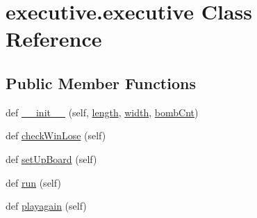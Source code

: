 \hypertarget{classexecutive_1_1executive}{}\section{executive.\+executive Class Reference}
\label{classexecutive_1_1executive}
\subsection*{Public Member Functions}
\begin{DoxyCompactItemize}
\item 
def \mbox{\hyperlink{classexecutive_1_1executive_a7456b110c146af5391ea26770144b461}{\+\_\+\+\_\+init\+\_\+\+\_\+}} (self, \mbox{\hyperlink{classexecutive_1_1executive_afcb8b34bb0f032c2ffae4573b9a42613}{length}}, \mbox{\hyperlink{classexecutive_1_1executive_a3ffae68509fd1c2b2043198df88b913c}{width}}, \mbox{\hyperlink{classexecutive_1_1executive_ab749a7a52e7361de73ee03285a25e804}{bomb\+Cnt}})
\item 
def \mbox{\hyperlink{classexecutive_1_1executive_a944d536ab4e80df2ef4c0494d7ea9f19}{check\+Win\+Lose}} (self)
\item 
def \mbox{\hyperlink{classexecutive_1_1executive_ae2161d95542ae653323bbfb9ae0ac27b}{set\+Up\+Board}} (self)
\item 
def \mbox{\hyperlink{classexecutive_1_1executive_abe92cddf119081cac6c747858df061d7}{run}} (self)
\item 
def \mbox{\hyperlink{classexecutive_1_1executive_ae9e95e04cf6a35e0857f0610c6428e80}{playagain}} (self)
\end{DoxyCompactItemize}
